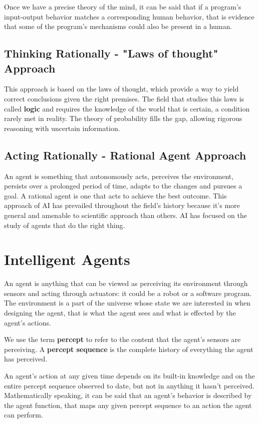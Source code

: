 \documentclass{article}
\begin{document}
Once we have a precise theory of the mind, it can be said that if a program's input-output behavior matches a corresponding human behavior, that is evidence that some of the program's mechanisms could also be present in a human. 

\subsection{Thinking Rationally - "Laws of thought" Approach}
This approach is based on the laws of thought, which provide a way to yield correct conclusions given the right premises. The field that studies this laws is called \textbf{logic} and requires the knowledge of the world that is certain,  a condition rarely met in reality. The theory of probability fills the gap, allowing rigorous reasoning with uncertain information.

\subsection{Acting Rationally - Rational Agent Approach}
An agent is something that autonomously acts, perceives the environment, persists over a prolonged period of time, adapts to the changes and pursues a goal. A rational agent is one that acts to achieve the best outcome.
This approach of AI has prevailed throughout the field's history because it's more general and amenable to scientific approach than others. AI has focused on the study of agents that do the right thing.

\clearpage
\section{Intelligent Agents}
An agent is anything that can be viewed as perceiving its environment through sensors and acting through actuators: it could be a robot or a software program. The environment is a part of the universe whose state we are interested in when designing the agent, that is what the agent sees and what is effected by the agent's actions.

We use the term \textbf{percept} to refer to the content that the agent's sensors are perceiving. A \textbf{percept sequence} is the complete history of everything the agent has perceived.

An agent's action at any given time depends on its built-in knowledge and on the entire percept sequence observed to date, but not in anything it hasn't perceived. Mathematically speaking, it can be said that an agent's behavior is described by the agent function, that maps any given percept sequence to an action the agent can perform.
\end{document}

